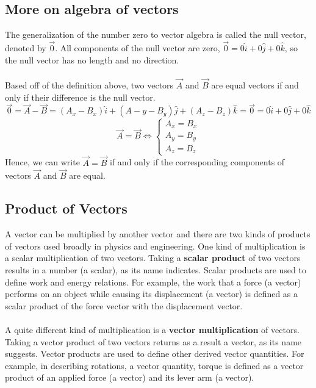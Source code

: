 \documentclass[12pt,addpoints]{exam}
\begin{document}
	\subsection*{More on algebra of vectors}
	The generalization of the number zero to vector algebra is called the null vector, denoted by  $\vec{0}$. All components of the null vector are zero, $\vec{0}=0\hat{i}+0\hat{j}+0\hat{k}$, so the null vector has no length and no direction.\\ \\
	Based off of the definition above, two vectors $\vec{A}$ and $\vec{B}$ are equal vectors if and only if their difference is the null vector.
	$$\vec{0}=\vec{A}-\vec{B}=(A_x-B_x)\hat{i}+(A-y-B_y)\hat{j}+(A_z-B_z)\hat{k}=\vec{0}=0\hat{i}+0\hat{j}+0\hat{k}$$
	$$\vec{A} = \vec{B} \Leftrightarrow \begin{cases} A_{x} = B_{x} \\ A_{y} = B_{y} \\ A_{z} = B_{z} \end{cases}$$
	Hence, we can write  $\vec{A}=\vec{B}$ if and only if the corresponding components of vectors $\vec{A}$ and $\vec{B}$ are equal.
	\subsection*{Product of Vectors}
	A vector can be multiplied by another vector and there are two kinds of products of vectors used broadly in physics and engineering. One kind of multiplication is a scalar multiplication of two vectors. Taking a \textbf{scalar product} of two vectors results in a number (a scalar), as its name indicates. Scalar products are used to define work and energy relations. For example, the work that a force (a vector) performs on an object while causing its displacement (a vector) is defined as a scalar product of the force vector with the displacement vector. \\ \\ 
	A quite different kind of multiplication is a \textbf{vector multiplication} of vectors. Taking a vector product of two vectors returns as a result a vector, as its name suggests. Vector products are used to define other derived vector quantities. For example, in describing rotations, a vector quantity, torque is defined as a vector product of an applied force (a vector) and its lever arm (a vector). 
\end{document}
